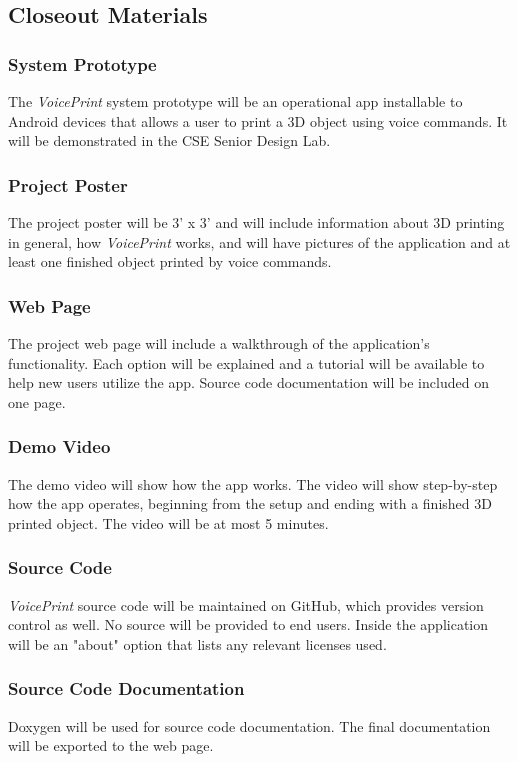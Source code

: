 \subsection{Closeout Materials}

\subsubsection{System Prototype}
The \textit{VoicePrint} system prototype will be an operational app installable to Android devices that allows a user to print a 3D object using voice commands. It will be demonstrated in the CSE Senior Design Lab.

\subsubsection{Project Poster}
The project poster will be 3' x 3' and will include information about 3D printing in general, how \textit{VoicePrint} works, and will have pictures of the application and at least one finished object printed by voice commands.

\subsubsection{Web Page}
The project web page will include a walkthrough of the application's functionality. Each option will be explained and a tutorial will be available to help new users utilize the app. Source code documentation will be included on one page.

\subsubsection{Demo Video}
The demo video will show how the app works. The video will show step-by-step how the app operates, beginning from the setup and ending with a finished 3D printed object. The video will be at most 5 minutes.

\subsubsection{Source Code}
\textit{VoicePrint} source code will be maintained on GitHub, which provides version control as well. No source will be provided to end users.  Inside the application will be an "about" option that lists any relevant licenses used.

\subsubsection{Source Code Documentation}
Doxygen will be used for source code documentation. The final documentation will be exported to the web page.

